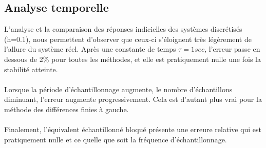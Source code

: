 \subsection{Analyse temporelle}
L'analyse et la comparaison des réponses indicielles des systèmes discrétisés (h=0.1), nous permettent d'observer que ceux-ci s'éloignent très légèrement de l'allure du système réel. Après une constante de temps $\tau=1sec$, l'erreur passe en dessous de 2\% pour toutes les méthodes, et elle est pratiquement nulle une fois la stabilité atteinte.\paragraph{}
Lorsque la période d'échantillonnage augmente, le nombre d'échantillons diminuant, l'erreur augmente progressivement. Cela est d'autant plus vrai pour la méthode des différences finies à gauche.
\paragraph{}
Finalement, l'équivalent échantillonné bloqué présente une erreure relative qui est pratiquement nulle et ce quelle que soit la fréquence d'échantillonnage.

